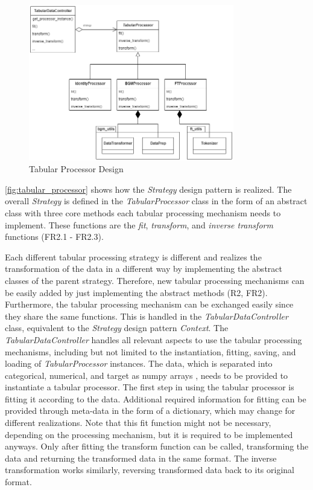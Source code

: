 \begin{figure}[h]
	\centering
	\includegraphics[width=0.8\textwidth]{images/tabular_processor.png}
	\caption{Tabular Processor Design}
	\label{fig:tabular_processor}
\end{figure}

\autoref{fig:tabular_processor} shows how the \textit{Strategy} design pattern is realized.
The overall \textit{Strategy} is defined in the \textit{TabularProcessor} class in the form of an abstract class with three core methods each tabular processing mechanism needs to implement.
These functions are the \textit{fit}, \textit{transform}, and \textit{inverse transform} functions (FR2.1 - FR2.3).

Each different tabular processing strategy is different and realizes the transformation of the data in a different way by implementing the abstract classes of the parent strategy.
Therefore, new tabular processing mechanisms can be easily added by just implementing the abstract methods (R2, FR2).
Furthermore, the tabular processing mechanism can be exchanged easily since they share the same functions.
This is handled in the \textit{TabularDataController} class, equivalent to the \textit{Strategy} design pattern \textit{Context}.
The \textit{TabularDataController} handles all relevant aspects to use the tabular processing mechanisms, including but not limited to the instantiation, fitting, saving, and loading of \textit{TabularProcessor} instances.
The data, which is separated into categorical, numerical, and target as numpy arrays \cite{harris2020array}, needs to be provided to instantiate a tabular processor.
The first step in using the tabular processor is fitting it according to the data.
Additional required information for fitting can be provided through meta-data in the form of a dictionary, which may change for different realizations.
Note that this fit function might not be necessary, depending on the processing mechanism, but it is required to be implemented anyways.
Only after fitting the transform function can be called, transforming the data and returning the transformed data in the same format.
The inverse transformation works similarly, reversing transformed data back to its original format.


